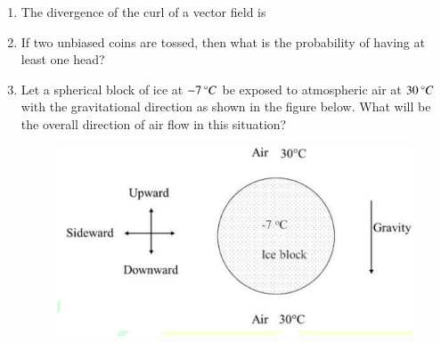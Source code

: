 \documentclass[journal]{IEEEtran}
\begin{document}
\begin{enumerate}[leftmargin=0pt]
\item
The divergence of the curl of a vector field is

\vspace{0.2cm}
\begin{enumerate}
\end{enumerate}
\hfill{}

\item
If two unbiased coins are tossed, then what is the probability of having at least one head?

\vspace{0.2cm}
\begin{enumerate}
\end{enumerate}
\hfill{}

\item
Let a spherical block of ice at $-7\,\degree C$ be exposed to atmospheric air at $30\,\degree C$ with the gravitational direction as shown in the figure below. What will be the overall direction of air flow in this situation?
\begin{figure}[H]\includegraphics[width=0.5\columnwidth]{Figs/image (95).png}\caption*{}\label{fig:q15}\end{figure}

\vspace{0.2cm}
\begin{enumerate}
\end{enumerate}
\hfill{}


\end{enumerate}
\end{document}
